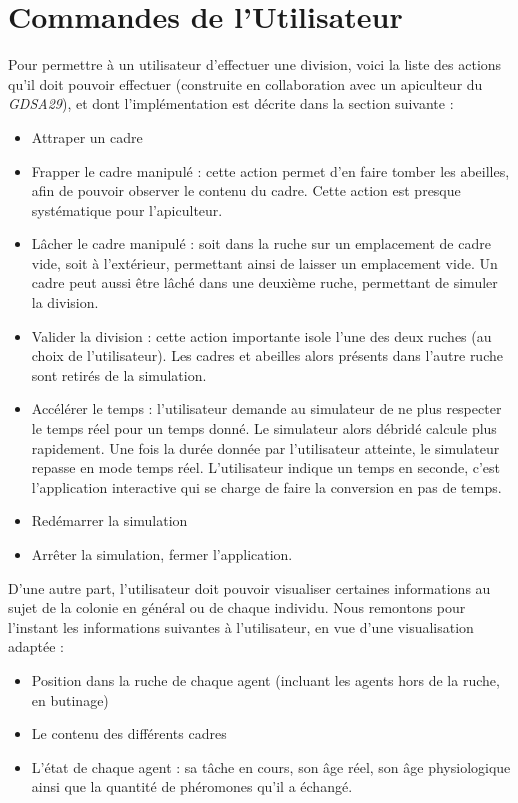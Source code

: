 		

	\section{Commandes de l'Utilisateur}
	
	Pour permettre à un utilisateur d'effectuer une division, voici la liste des actions qu'il doit pouvoir effectuer (construite en collaboration avec un apiculteur du \textit{GDSA29}), et dont l'implémentation est décrite dans la section suivante :
		\begin{itemize}
			\item Attraper un cadre
			\item Frapper le cadre manipulé : cette action permet d'en faire tomber les abeilles, afin de pouvoir observer le contenu du cadre. Cette action est presque systématique pour l'apiculteur.
			\item Lâcher le cadre manipulé : soit dans la ruche sur un emplacement de cadre vide, soit à l'extérieur, permettant ainsi de laisser un emplacement vide. Un cadre peut aussi être lâché dans une deuxième ruche, permettant de simuler la division.
			\item Valider la division : cette action importante isole l'une des deux ruches (au choix de l'utilisateur). Les cadres et abeilles alors présents dans l'autre ruche sont retirés de la simulation.
			\item Accélérer le temps : l'utilisateur demande au simulateur de ne plus respecter le temps réel pour un temps donné. Le simulateur alors débridé calcule plus rapidement. Une fois la durée donnée par l'utilisateur atteinte, le simulateur repasse en mode temps réel. L'utilisateur indique un temps en seconde, c'est l'application interactive qui se charge de faire la conversion en pas de temps.
			\item Redémarrer la simulation
			\item Arrêter la simulation, fermer l'application.		
		\end{itemize}	
		
		D'une autre part, l'utilisateur doit pouvoir visualiser certaines informations au sujet de la colonie en général ou de chaque individu. Nous remontons pour l'instant les informations suivantes à l'utilisateur, en vue d'une visualisation adaptée :
		\begin{itemize}
			\item Position dans la ruche de chaque agent (incluant les agents hors de la ruche, en butinage)
			\item Le contenu des différents cadres
			\item L'état de chaque agent : sa tâche en cours, son âge réel, son âge physiologique ainsi que la quantité de phéromones qu'il a échangé.
		\end{itemize}		

